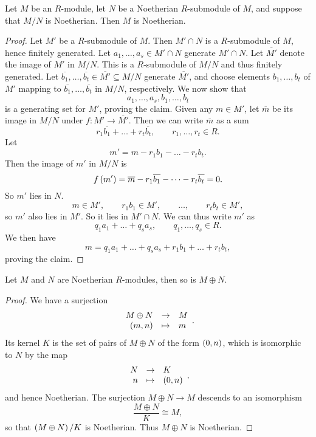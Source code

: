 \pagebreak

\begin{proposition}
Let $ M $ be an $ R $-module, let $ N $ be a Noetherian $ R $-submodule of $ M $, and suppose that $ M / N $ is Noetherian. Then $ M $ is Noetherian.
\end{proposition}

\begin{proof}
Let $ M' $ be a $ R $-submodule of $ M $. Then $ M' \cap N $ is a $ R $-submodule of $ M $, hence finitely generated. Let $ a_1, \dots, a_s \in M' \cap N $ generate $ M' \cap N $. Let $ \overline{M'} $ denote the image of $ M' $ in $ M / N $. This is a $ R $-submodule of $ M / N $ and thus finitely generated. Let $ \overline{b_1}, \dots, \overline{b_t} \in \overline{M'} \subseteq M / N $ generate $ \overline{M'} $, and choose elements $ b_1, \dots, b_t $ of $ M' $ mapping to $ \overline{b_1}, \dots, \overline{b_t} $ in $ M / N $, respectively. We now show that
$$ a_1, \dots, a_s, b_1, \dots, b_t $$
is a generating set for $ M' $, proving the claim. Given any $ m \in M' $, let $ \overline{m} $ be its image in $ M / N $ under $ f : M' \to \overline{M'} $. Then we can write $ \overline{m} $ as a sum
$$ r_1\overline{b_1} + \dots + r_t\overline{b_t}, \qquad r_1, \dots, r_t \in R. $$
Let
$$ m' = m - r_1b_1 - \dots - r_tb_t. $$
Then the image of $ m' $ in $ M / N $ is
$$ f\left( m' \right) = \overline{m} - r_1\overline{b_1} - \dots - r_t\overline{b_t} = 0. $$
So $ m' $ lies in $ N $.
$$ m \in M', \qquad r_1b_1 \in M', \qquad \dots, \qquad r_tb_t \in M', $$
so $ m' $ also lies in $ M' $. So it lies in $ M' \cap N $. We can thus write $ m' $ as
$$ q_1a_1 + \dots + q_sa_s, \qquad q_1, \dots, q_s \in R. $$
We then have
$$ m = q_1a_1 + \dots + q_sa_s + r_1b_1 + \dots + r_tb_t, $$
proving the claim.
\end{proof}

\begin{corollary}
Let $ M $ and $ N $ are Noetherian $ R $-modules, then so is $ M \oplus N $.
\end{corollary}

\begin{proof}
We have a surjection
$$ \function{M \oplus N}{M}{\rb{m, n}}{m}. $$
Its kernel $ K $ is the set of pairs of $ M \oplus N $ of the form $ \left( 0, n \right) $, which is isomorphic to $ N $ by the map
$$ \function{N}{K}{n}{\rb{0, n}}, $$
and hence Noetherian. The surjection $ M \oplus N \to M $ descends to an isomorphism
$$ \dfrac{M \oplus N}{K} \cong M, $$
so that $ \left( M \oplus N \right) / K $ is Noetherian. Thus $ M \oplus N $ is Noetherian.
\end{proof}

